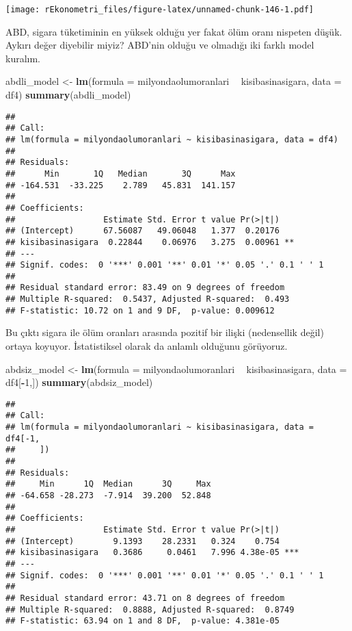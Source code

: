 \documentclass[
]{book}
\newenvironment{Shaded}{\begin{snugshade}}{\end{snugshade}}
\newcommand{\DataTypeTok}[1]{\textcolor[rgb]{0.13,0.29,0.53}{#1}}
\newcommand{\DecValTok}[1]{\textcolor[rgb]{0.00,0.00,0.81}{#1}}
\newcommand{\KeywordTok}[1]{\textcolor[rgb]{0.13,0.29,0.53}{\textbf{#1}}}
\newcommand{\NormalTok}[1]{#1}
\newcommand{\OperatorTok}[1]{\textcolor[rgb]{0.81,0.36,0.00}{\textbf{#1}}}
\newcommand{\StringTok}[1]{\textcolor[rgb]{0.31,0.60,0.02}{#1}}
\begin{document}
\texttt{[image: rEkonometri\_files/figure-latex/unnamed-chunk-146-1.pdf]}

ABD, sigara tüketiminin en yüksek olduğu yer fakat ölüm oranı nispeten düşük. Aykırı değer diyebilir miyiz? ABD'nin olduğu ve olmadığı iki farklı model kuralım.

\begin{Shaded}
\begin{Highlighting}[]
\NormalTok{abdli_model <-}\StringTok{ }\KeywordTok{lm}\NormalTok{(}\DataTypeTok{formula =}\NormalTok{ milyondaolumoranlari }\OperatorTok{~}\StringTok{ }\NormalTok{kisibasinasigara, }\DataTypeTok{data =}\NormalTok{ df4)}
\KeywordTok{summary}\NormalTok{(abdli_model)}
\end{Highlighting}
\end{Shaded}

\begin{verbatim}
## 
## Call:
## lm(formula = milyondaolumoranlari ~ kisibasinasigara, data = df4)
## 
## Residuals:
##      Min       1Q   Median       3Q      Max 
## -164.531  -33.225    2.789   45.831  141.157 
## 
## Coefficients:
##                  Estimate Std. Error t value Pr(>|t|)   
## (Intercept)      67.56087   49.06048   1.377  0.20176   
## kisibasinasigara  0.22844    0.06976   3.275  0.00961 **
## ---
## Signif. codes:  0 '***' 0.001 '**' 0.01 '*' 0.05 '.' 0.1 ' ' 1
## 
## Residual standard error: 83.49 on 9 degrees of freedom
## Multiple R-squared:  0.5437, Adjusted R-squared:  0.493 
## F-statistic: 10.72 on 1 and 9 DF,  p-value: 0.009612
\end{verbatim}

Bu çıktı sigara ile ölüm oranları arasında pozitif bir ilişki (nedensellik değil) ortaya koyuyor. İstatistiksel olarak da anlamlı olduğunu görüyoruz.

\begin{Shaded}
\begin{Highlighting}[]
\NormalTok{abdsiz_model <-}\StringTok{ }\KeywordTok{lm}\NormalTok{(}\DataTypeTok{formula =}\NormalTok{ milyondaolumoranlari }\OperatorTok{~}\StringTok{ }\NormalTok{kisibasinasigara, }\DataTypeTok{data =}\NormalTok{ df4[}\OperatorTok{-}\DecValTok{1}\NormalTok{,])}
\KeywordTok{summary}\NormalTok{(abdsiz_model)}
\end{Highlighting}
\end{Shaded}

\begin{verbatim}
## 
## Call:
## lm(formula = milyondaolumoranlari ~ kisibasinasigara, data = df4[-1, 
##     ])
## 
## Residuals:
##     Min      1Q  Median      3Q     Max 
## -64.658 -28.273  -7.914  39.200  52.848 
## 
## Coefficients:
##                  Estimate Std. Error t value Pr(>|t|)    
## (Intercept)        9.1393    28.2331   0.324    0.754    
## kisibasinasigara   0.3686     0.0461   7.996 4.38e-05 ***
## ---
## Signif. codes:  0 '***' 0.001 '**' 0.01 '*' 0.05 '.' 0.1 ' ' 1
## 
## Residual standard error: 43.71 on 8 degrees of freedom
## Multiple R-squared:  0.8888, Adjusted R-squared:  0.8749 
## F-statistic: 63.94 on 1 and 8 DF,  p-value: 4.381e-05
\end{verbatim}
\end{document}
